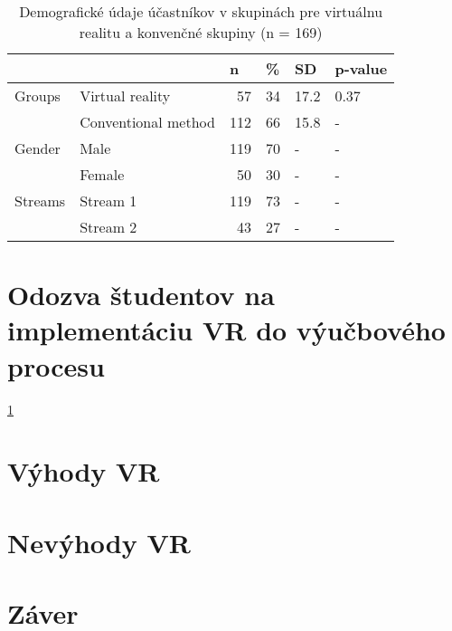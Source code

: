 \documentclass[10pt,twoside,slovak,a4paper]{article}
\begin{document}
\begin{table}[htbp]
  \centering
  \caption{Demografické údaje účastníkov v skupinách pre virtuálnu realitu a konvenčné skupiny (n = 169) \cite{6826194}}
    \begin{tabular}{|r|l|r|r|l|l|}
    \toprule
    \multicolumn{1}{|r}{} &       & \multicolumn{1}{l|}{n  } & \multicolumn{1}{l|}{\%} & SD    &  p-value  \\
    \midrule
    \multicolumn{1}{|l|}{Groups } & Virtual reality  & 57    & 34    & 17.2   & 0.37 \\
          & Conventional method & 112   & 66    & 15.8  & - \\
    \midrule
    \multicolumn{1}{|l|}{Gender } & Male   & 119   & 70    & -     & - \\
          & Female & 50    & 30    & -     & - \\
    \midrule
    \multicolumn{1}{|l|}{Streams } & Stream 1   & 119   & 73    & -     & - \\
          & Stream 2 & 43    & 27    & -     & - \\
    \bottomrule
    \end{tabular}%
  \label{tab:demografia}%
\end{table}%



\section{Odozva študentov na implementáciu VR do výučbového procesu} \label{Odozva}

\ref{tab:demografia}


\section{Výhody VR} \label{vyhody}


\section{Nevýhody VR} \label{nevyhody}


\section{Záver} \label{zaver} %





\end{document}
